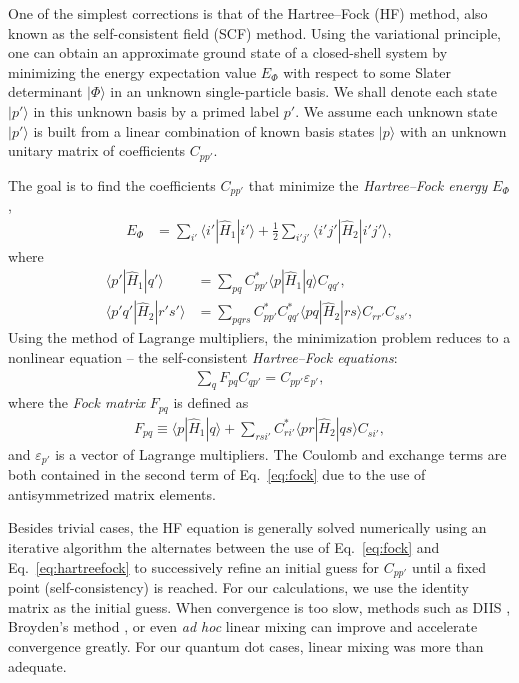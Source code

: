 \documentclass[aip, jcp, 12pt]{revtex4-1}
\begin{document}
One of the simplest corrections is that of the Hartree--Fock (HF) method, also known as the self-consistent field (SCF) method.  Using the variational principle, one can obtain an approximate ground state of a closed-shell system by minimizing the energy expectation value $E_{\Phi}$ with respect to some Slater determinant $|\Phi\rangle$ in an unknown single-particle basis.  We shall denote each state $|p'\rangle$ in this unknown basis by a primed label $p'$.  We assume each unknown state $|p'\rangle$ is built from a linear combination of known basis states $|p\rangle$ with an unknown unitary matrix of coefficients $C_{p p'}$.

The goal is to find the coefficients $C_{p p'}$ that minimize the \textit{Hartree--Fock energy} $E_{\Phi}$,
\begin{align}
  E_{\Phi} &= \sum_{i'} \langle i' | \hat{H}_1 | i' \rangle + \frac{1}{2} \sum_{i' j'} \langle i' j' | \hat{H}_2 | i' j' \rangle \label{eq:hfenergy},
\end{align}
where
\begin{align}
  \langle p' | \hat{H}_1 | q' \rangle &= \sum_{p q} C_{p p'}^* \langle p | \hat{H}_1 | q \rangle C_{q q'}^{}, \label{eq:hftransform1} \\
  \langle p' q' | \hat{H}_2 | r' s' \rangle &= \sum_{p q r s} C_{p p'}^* C_{q q'}^* \langle p q | \hat{H}_2 | r s \rangle C_{r r'}^{} C_{s s'}^{}, \label{eq:hftransform2}
\end{align}
Using the method of Lagrange multipliers, the minimization problem reduces to a nonlinear equation -- the self-consistent \textit{Hartree--Fock equations}:
\begin{align} \label{eq:hartreefock}
  \sum_q F_{p q} C_{q p'} = C_{p p'} \varepsilon_{p'},
\end{align}
where the \textit{Fock matrix} $F_{p q}$ is defined as
\begin{align} \label{eq:fock}
  F_{p q} \equiv \langle p | \hat{H}_1 | q \rangle + \sum_{r s i'} C_{r i'}^* \langle p r | \hat{H}_2 | q s \rangle C_{s i'}^{},
\end{align}
and $\varepsilon_{p'}$ is a vector of Lagrange multipliers.  The Coulomb and exchange terms are both contained in the second term of Eq.\ \eqref{eq:fock} due to the use of antisymmetrized matrix elements.

Besides trivial cases, the HF equation is generally solved numerically using an iterative algorithm the alternates between the use of Eq.\ \eqref{eq:fock} and Eq.\ \eqref{eq:hartreefock} to successively refine an initial guess for $C_{p p'}$ until a fixed point (self-consistency) is reached.  For our calculations, we use the identity matrix as the initial guess.  When convergence is too slow, methods such as DIIS \cite{PULAY1980393,JCC:JCC540030413}, Broyden's method \cite{broyden1965class}, or even \textit{ad hoc} linear mixing can improve and accelerate convergence greatly.  For our quantum dot cases, linear mixing was more than adequate.
\end{document}
